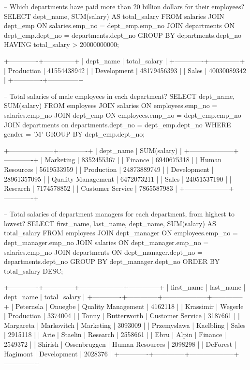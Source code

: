 -- Which departments have paid more than 20 billion dollars for their employees?
SELECT 
    dept_name, SUM(salary) AS total_salary
FROM
    salaries
        JOIN
    dept_emp ON salaries.emp_no = dept_emp.emp_no
        JOIN
    departments ON dept_emp.dept_no = departments.dept_no
GROUP BY departments.dept_no
HAVING total_salary > 20000000000;

+-------------+--------------+
| dept_name   | total_salary |
+-------------+--------------+
| Production  |  41554438942 |
| Development |  48179456393 |
| Sales       |  40030089342 |
+-------------+--------------+

-- Total salaries of male employees in each department?
SELECT 
    dept_name, SUM(salary)
FROM
    employees
        JOIN
    salaries ON employees.emp_no = salaries.emp_no
        JOIN
    dept_emp ON employees.emp_no = dept_emp.emp_no
        JOIN
    departments on departments.dept_no = dept_emp.dept_no
WHERE gender = 'M'
GROUP BY dept_emp.dept_no;

+--------------------+-------------+
| dept_name          | SUM(salary) |
+--------------------+-------------+
| Marketing          |  8352455367 |
| Finance            |  6940675318 |
| Human Resources    |  5619533959 |
| Production         | 24873889749 |
| Development        | 28961357095 |
| Quality Management |  6472073211 |
| Sales              | 24051537190 |
| Research           |  7174578852 |
| Customer Service   |  7865587983 |
+--------------------+-------------+

-- Total salaries of department managers for each department, from highest to lowest?
SELECT 
    first_name,
    last_name,
    dept_name,
    SUM(salary) AS total_salary
FROM
    employees
        JOIN
    dept_manager ON employees.emp_no = dept_manager.emp_no
        JOIN
    salaries ON dept_manager.emp_no = salaries.emp_no
        JOIN
    departments ON dept_manager.dept_no = departments.dept_no
GROUP BY dept_manager.dept_no
ORDER BY total_salary DESC;

+-------------+--------------+--------------------+--------------+
| first_name  | last_name    | dept_name          | total_salary |
+-------------+--------------+--------------------+--------------+
| Peternela   | Onuegbe      | Quality Management |      4162118 |
| Krassimir   | Wegerle      | Production         |      3374004 |
| Tonny       | Butterworth  | Customer Service   |      3187661 |
| Margareta   | Markovitch   | Marketing          |      3093009 |
| Przemyslawa | Kaelbling    | Sales              |      2915118 |
| Arie        | Staelin      | Research           |      2558661 |
| Ebru        | Alpin        | Finance            |      2549372 |
| Shirish     | Ossenbruggen | Human Resources    |      2098298 |
| DeForest    | Hagimont     | Development        |      2028376 |
+-------------+--------------+--------------------+--------------+